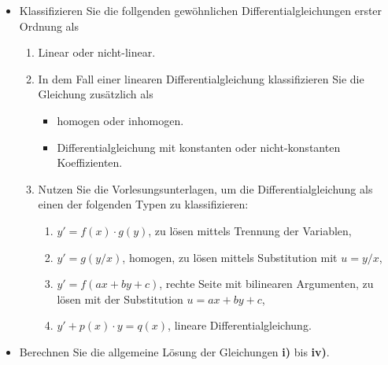 {
\begin{itemize}
\item[\textbf{1)}] Klassifizieren Sie die follgenden gew\"ohnlichen Differentialgleichungen 
                   erster Ordnung als 

\begin{enumerate}
\item[\textbf{a)}] Linear oder nicht-linear.
\item[\textbf{b)}] In dem Fall einer linearen Differentialgleichung klassifizieren Sie 
                   die Gleichung zus\"atzlich als
\begin{itemize}
\item homogen oder inhomogen.
\item Differentialgleichung mit konstanten oder nicht-konstanten Koeffizienten.
\end{itemize}
\item[\textbf{c)}]  Nutzen Sie die Vorlesungsunterlagen, um die Differentialgleichung als
                    einen der folgenden Typen zu klassifizieren:
\begin{enumerate}
\item $y'= f(x)\cdot g(y)$, zu lösen mittels Trennung der Variablen,
\item $y'=g(y/x)$, homogen, zu l\"osen mittels Substitution mit $u=y/x$,
\item $y'=f(ax+by+c)$, rechte Seite mit bilinearen Argumenten, zu lösen mit der 
      Substitution $u=ax+by+c$,
\item $y'+p(x) \cdot y = q(x)$, lineare Differentialgleichung.
\end{enumerate}
\end{enumerate}
\begin{multicols}{2}
\end{multicols}
\item[\textbf{2)}] Berechnen Sie die allgemeine L\"osung der Gleichungen \textbf{i)} 
                   bis \textbf{iv)}.
\end{itemize}
}


